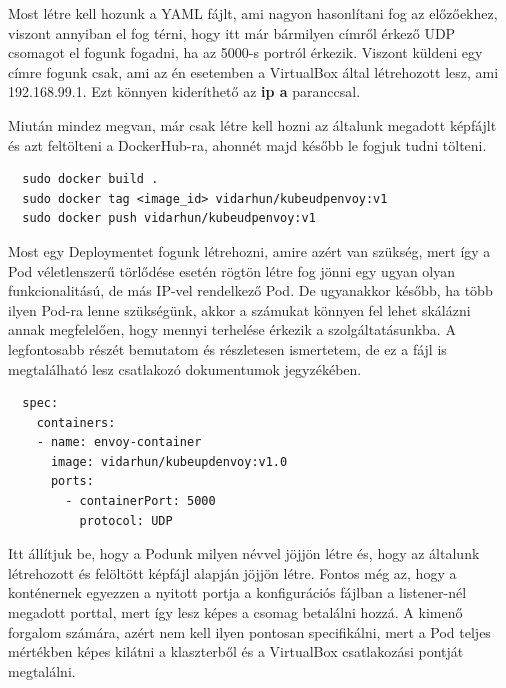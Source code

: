 \documentclass[a4paper,oneside]{article}
\begin{document}
Most létre kell hozunk a YAML fájlt, ami nagyon hasonlítani fog az előzőekhez,
viszont annyiban el fog térni, hogy itt már bármilyen címről érkező UDP csomagot
el fogunk fogadni, ha az 5000-s portról érkezik. Viszont küldeni egy címre fogunk
csak, ami az én esetemben a VirtualBox által létrehozott lesz, ami 192.168.99.1.
Ezt könnyen kideríthető az \textbf{ip a} paranccsal.

Miután mindez megvan, már csak létre kell hozni az általunk megadott képfájlt és
azt feltölteni a DockerHub-ra, ahonnét majd később le fogjuk tudni tölteni.
\begin{verbatim}
  sudo docker build .
  sudo docker tag <image_id> vidarhun/kubeudpenvoy:v1
  sudo docker push vidarhun/kubeudpenvoy:v1
\end{verbatim}
Most egy Deploymentet fogunk létrehozni, amire azért van szükség, mert így
a Pod véletlenszerű törlődése esetén rögtön létre fog jönni egy ugyan olyan
funkcionalitású, de más IP-vel rendelkező Pod. De ugyanakkor később, ha több
ilyen Pod-ra lenne szükségünk, akkor a számukat könnyen fel lehet skálázni
annak megfelelően, hogy mennyi terhelése érkezik a szolgáltatásunkba.
A legfontosabb részét bemutatom és részletesen ismertetem, de ez a fájl is
megtalálható lesz csatlakozó dokumentumok jegyzékében.
\begin{verbatim}
  spec:
    containers:
    - name: envoy-container
      image: vidarhun/kubeupdenvoy:v1.0
      ports:
        - containerPort: 5000
          protocol: UDP
\end{verbatim}
Itt állítjuk be, hogy a Podunk milyen névvel jöjjön létre és, hogy az
általunk létrehozott és felöltött képfájl alapján jöjjön létre.
Fontos még az, hogy a konténernek egyezzen a nyitott portja a konfigurációs
fájlban a listener-nél megadott porttal, mert így lesz képes a csomag betalálni
hozzá. A kimenő forgalom számára, azért nem kell ilyen pontosan specifikálni,
mert a Pod teljes mértékben képes kilátni a klaszterből és a VirtualBox
csatlakozási pontját megtalálni.
\end{document}
